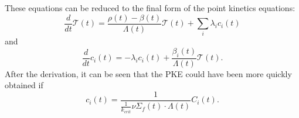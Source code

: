 \documentclass{ansconf}
\numberwithin{equation}{section}
\begin{document}
These equations can be reduced to the final form of the point kinetics equations:
\begin{equation}
\frac{d}{dt}\mathcal{T}\left(t\right)=\frac{\rho\left(t\right)-\beta\left(t\right)}{\Lambda\left(t\right)}\mathcal{T}\left(t\right)+\sum_{i}\lambda_{i}c_{i}\left(t\right)
\end{equation}
and
\begin{equation}
\frac{d}{dt}c_{i}\left(t\right)=-\lambda_{i}c_{i}\left(t\right)+\frac{\beta_{i}\left(t\right)}{\Lambda\left(t\right)}\mathcal{T}\left(t\right).
\end{equation}
After the derivation, it can be seen that the PKE could have been more quickly obtained if
\begin{equation}
c_{i}\left(t\right)=\frac{1}{\frac{1}{k_{crit}}\nu\Sigma_{f}\left(t\right)\cdot\Lambda\left(t\right)}C_{i}\left(t\right).
\end{equation}
\end{document}
